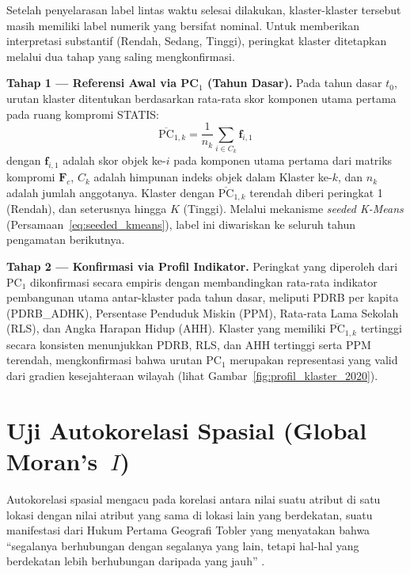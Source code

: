 Setelah penyelarasan label lintas waktu selesai dilakukan, klaster-klaster tersebut masih memiliki label numerik yang bersifat nominal. Untuk memberikan interpretasi substantif (Rendah, Sedang, Tinggi), peringkat klaster ditetapkan melalui dua tahap yang saling mengkonfirmasi.

\textbf{Tahap 1 — Referensi Awal via PC$_1$ (Tahun Dasar).} Pada tahun dasar $t_0$, urutan klaster ditentukan berdasarkan rata-rata skor komponen utama pertama pada ruang kompromi STATIS:
\begin{equation} \label{eq:pc1_rank}
    \overline{\text{PC}}_{1,k} = \frac{1}{n_k} \sum_{i \in C_k} \mathbf{f}_{i,1}
\end{equation}
dengan $\mathbf{f}_{i,1}$ adalah skor objek ke-$i$ pada komponen utama pertama dari matriks kompromi $\mathbf{F}_c$, $C_k$ adalah himpunan indeks objek dalam Klaster ke-$k$, dan $n_k$ adalah jumlah anggotanya. Klaster dengan $\overline{\text{PC}}_{1,k}$ terendah diberi peringkat 1 (Rendah), dan seterusnya hingga $K$ (Tinggi). Melalui mekanisme \textit{seeded K-Means} (Persamaan~\ref{eq:seeded_kmeans}), label ini diwariskan ke seluruh tahun pengamatan berikutnya.

\textbf{Tahap 2 — Konfirmasi via Profil Indikator.} Peringkat yang diperoleh dari PC$_1$ dikonfirmasi secara empiris dengan membandingkan rata-rata indikator pembangunan utama antar-klaster pada tahun dasar, meliputi PDRB per kapita (PDRB\_ADHK), Persentase Penduduk Miskin (PPM), Rata-rata Lama Sekolah (RLS), dan Angka Harapan Hidup (AHH). Klaster yang memiliki $\overline{\text{PC}}_{1,k}$ tertinggi secara konsisten menunjukkan PDRB, RLS, dan AHH tertinggi serta PPM terendah, mengkonfirmasi bahwa urutan PC$_1$ merupakan representasi yang valid dari gradien kesejahteraan wilayah (lihat Gambar~\ref{fig:profil_klaster_2020}).

\section{\normalsize Uji Autokorelasi Spasial (Global Moran's~\texorpdfstring{$I$}{I})}

Autokorelasi spasial mengacu pada korelasi antara nilai suatu atribut di satu lokasi dengan nilai atribut yang sama di lokasi lain yang berdekatan, suatu manifestasi dari Hukum Pertama Geografi Tobler yang menyatakan bahwa ``segalanya berhubungan dengan segalanya yang lain, tetapi hal-hal yang berdekatan lebih berhubungan daripada yang jauh'' \citep{johnson2007}.

